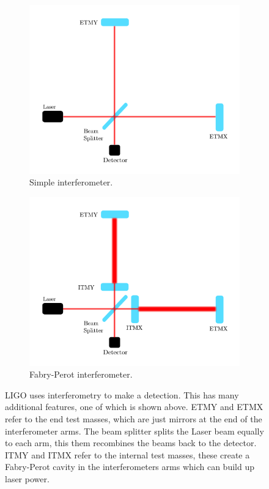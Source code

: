 \begin{figure}[hp]
    \centering
    \begin{subfigure}[h]{0.6\linewidth}
    	 \includegraphics[width=\textwidth]{C1_intro/interferometer.pdf}
    	 \caption{Simple interferometer.}
    	 \label{detectors:interferometer:simple}
    \end{subfigure}
	\begin{subfigure}[h]{0.6\linewidth}
		\includegraphics[width=\textwidth]{C1_intro/interferometer_fabry.pdf}
		\caption{Fabry-Perot interferometer.}
		\label{detectors:interferometer:fabry}
	\end{subfigure}
    \caption{\gls{LIGO} uses interferometry to make a detection. This has many additional features, one of which is shown above. ETMY and ETMX refer to the end test masses, which are just mirrors at the end of the interferometer arms. The beam splitter splits the Laser beam equally to each arm, this them recombines the beams back to the detector.
    ITMY and ITMX refer to the internal test masses, these create a Fabry-Perot cavity in the interferometers arms which can build up laser power. }
    \label{detectors:interferometer}
\end{figure}
